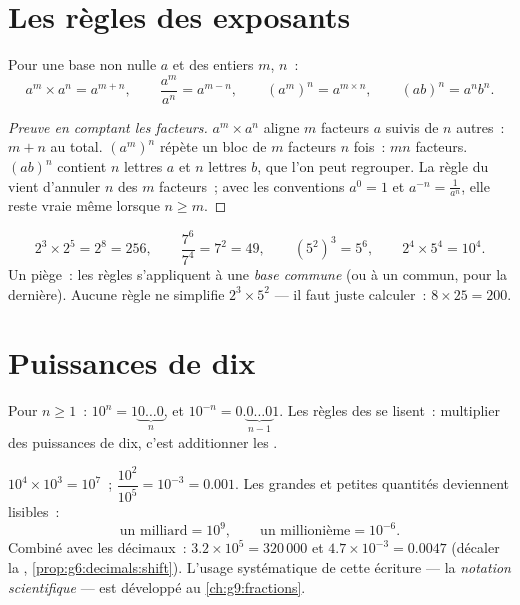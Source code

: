 \section{Les règles des exposants}

\begin{theorem}\label{thm:g8:powers:rules}
Pour une base non nulle $a$ et des  entiers $m$, $n$~:
\[
a^m \times a^n = a^{m+n},
\qquad
\frac{a^m}{a^n} = a^{m-n},
\qquad
\left(a^m\right)^n = a^{m \times n},
\qquad
(ab)^n = a^n b^n .
\]
\end{theorem}

\begin{proof}[Preuve en comptant les facteurs]
$a^m \times a^n$ aligne $m$ facteurs $a$ suivis de $n$ autres~:
$m + n$ au total. $\left(a^m\right)^n$ répète un bloc de $m$ facteurs
$n$ fois~: $mn$ facteurs. $(ab)^n$ contient $n$ lettres $a$ et $n$
lettres $b$, que l'on peut regrouper. La règle du  vient
d'annuler $n$ des $m$ facteurs~; avec les conventions $a^0 = 1$ et
$a^{-n} = \frac{1}{a^n}$, elle reste vraie même lorsque $n \geq m$.
\end{proof}

\begin{example}\label{ex:g8:powers:rules}
\[
2^3 \times 2^5 = 2^8 = 256,
\qquad
\frac{7^6}{7^4} = 7^2 = 49,
\qquad
\left(5^2\right)^3 = 5^6,
\qquad
2^4 \times 5^4 = 10^4 .
\]
Un piège~: les règles s'appliquent à une \emph{base commune} (ou à un
 commun, pour la dernière). Aucune règle ne simplifie
$2^3 \times 5^2$ --- il faut juste calculer~: $8 \times 25 = 200$.
\end{example}

\section{Puissances de dix}

\begin{proposition}\label{prop:g8:powers:ten}
Pour $n \geq 1$~: $10^n = 1\underbrace{0\dots0}_{n}$, et
$10^{-n} = 0.\underbrace{0\dots0}_{n-1}1$. Les règles des 
se lisent~: multiplier des puissances de dix, c'est additionner les
.
\end{proposition}

\begin{example}\label{ex:g8:powers:ten}
$10^4 \times 10^3 = 10^7$~; \quad
$\dfrac{10^2}{10^5} = 10^{-3} = 0.001$. Les grandes et petites
quantités deviennent lisibles~:
\[
\text{un milliard} = 10^9,
\qquad
\text{un millionième} = 10^{-6}.
\]
Combiné avec les décimaux~: $3.2 \times 10^5 = 320\,000$ et
$4.7 \times 10^{-3} = 0.0047$ (décaler la ,
\cref{prop:g6:decimals:shift}). L'usage systématique de cette
écriture --- la \emph{notation scientifique} --- est développé au
\cref{ch:g9:fractions}.
\end{example}

